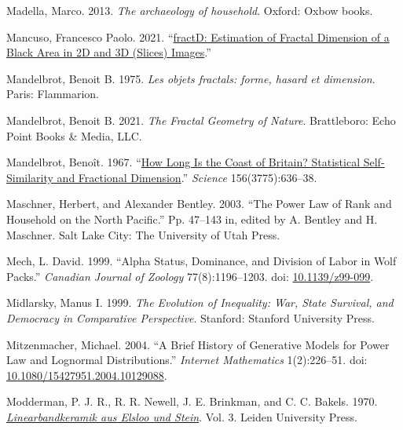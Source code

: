\documentclass[
  12pt,
]{book}
\newlength{\cslhangindent}
\newlength{\cslentryspacingunit} %
\newenvironment{CSLReferences}[2] %
 {%
  \setlength{\parindent}{0pt}
  \ifodd #1
  \let\oldpar\par
  \def\par{\hangindent=\cslhangindent\oldpar}
  \fi
  \setlength{\parskip}{#2\cslentryspacingunit}
 }%
 {}
\begin{document}
\begin{CSLReferences}{1}{0}
\leavevmode{}%
Madella, Marco. 2013. \emph{The archaeology of household}. Oxford: Oxbow books.

\leavevmode{}%
Mancuso, Francesco Paolo. 2021. {``\href{https://CRAN.R-project.org/package=fractD}{fractD: Estimation of Fractal Dimension of a Black Area in 2D and 3D (Slices) Images}.''}

\leavevmode{}%
Mandelbrot, Benoit B. 1975. \emph{Les objets fractals: forme, hasard et dimension}. Paris: Flammarion.

\leavevmode{}%
Mandelbrot, Benoit B. 2021. \emph{The Fractal Geometry of Nature}. Brattleboro: Echo Point Books \& Media, LLC.

\leavevmode{}%
Mandelbrot, Benoît. 1967. {``\href{https://www.jstor.org/stable/1721427}{How Long Is the Coast of Britain? Statistical Self-Similarity and Fractional Dimension}.''} \emph{Science} 156(3775):636--38.

\leavevmode{}%
Maschner, Herbert, and Alexander Bentley. 2003. {``The Power Law of Rank and Household on the North Pacific.''} Pp. 47--143 in, edited by A. Bentley and H. Maschner. Salt Lake City: The University of Utah Press.

\leavevmode{}%
Mech, L. David. 1999. {``Alpha Status, Dominance, and Division of Labor in Wolf Packs.''} \emph{Canadian Journal of Zoology} 77(8):1196--1203. doi: \href{https://doi.org/10.1139/z99-099}{10.1139/z99-099}.

\leavevmode{}%
Midlarsky, Manus I. 1999. \emph{The Evolution of Inequality: War, State Survival, and Democracy in Comparative Perspective}. Stanford: Stanford University Press.

\leavevmode{}%
Mitzenmacher, Michael. 2004. {``A Brief History of Generative Models for Power Law and Lognormal Distributions.''} \emph{Internet Mathematics} 1(2):226--51. doi: \href{https://doi.org/10.1080/15427951.2004.10129088}{10.1080/15427951.2004.10129088}.

\leavevmode{}%
Modderman, P. J. R., R. R. Newell, J. E. Brinkman, and C. C. Bakels. 1970. \emph{\href{http://hdl.handle.net/1887/2720923}{Linearbandkeramik aus Elsloo und Stein}}. Vol. 3. Leiden University Press.


\end{CSLReferences}
\end{document}
